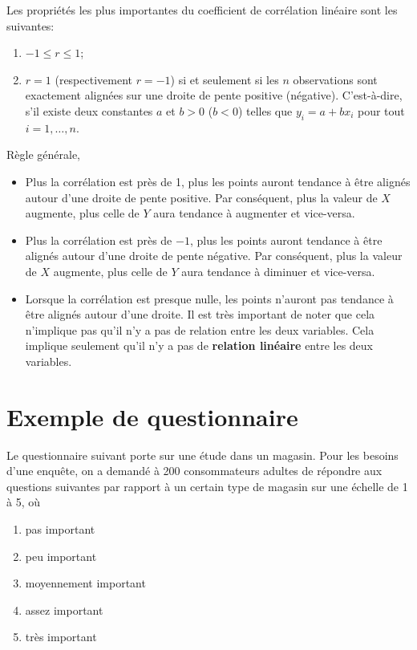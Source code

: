 \documentclass[
]{book}
\providecommand{\tightlist}{%
  \setlength{\itemsep}{0pt}\setlength{\parskip}{0pt}}
\theoremstyle{definition}
\theoremstyle{definition}
\theoremstyle{definition}
\theoremstyle{remark}
\begin{document}
Les propriétés les plus importantes du coefficient de corrélation linéaire sont les suivantes:

\begin{enumerate}
\def\labelenumi{\arabic{enumi})}
\tightlist
\item
  \(-1 \leq r \leq 1\);
\item
  \(r=1\) (respectivement \(r=-1\)) si et seulement si les \(n\) observations sont exactement alignées sur une droite de pente positive (négative). C'est-à-dire, s'il existe deux constantes \(a\) et \(b>0\) (\(b<0\)) telles que \(y_i=a+b x_i\) pour tout \(i=1, \ldots, n\).
\end{enumerate}

Règle générale,

\begin{itemize}
\tightlist
\item
  Plus la corrélation est près de 1, plus les points auront tendance à être alignés autour d'une droite de pente positive. Par conséquent, plus la valeur de \(X\) augmente, plus celle de \(Y\) aura tendance à augmenter et vice-versa.
\item
  Plus la corrélation est près de \(-1\), plus les points auront tendance à être alignés autour d'une droite de pente négative. Par conséquent, plus la valeur de \(X\) augmente, plus celle de \(Y\) aura tendance à diminuer et vice-versa.
\item
  Lorsque la corrélation est presque nulle, les points n'auront pas tendance à être alignés autour d'une droite. Il est très important de noter que cela n'implique pas qu'il n'y a pas de relation entre les deux variables. Cela implique seulement qu'il n'y a pas de \textbf{relation linéaire} entre les deux variables.
\end{itemize}

\hypertarget{exemple-de-questionnaire}{%
\section{Exemple de questionnaire}\label{exemple-de-questionnaire}}

Le questionnaire suivant porte sur une étude dans un magasin. Pour les besoins d'une enquête, on a demandé à 200 consommateurs adultes de répondre aux questions suivantes par rapport à un certain type de magasin sur une échelle de 1 à 5, où

\begin{enumerate}
\def\labelenumi{\arabic{enumi}.}
\tightlist
\item
  pas important
\item
  peu important
\item
  moyennement important
\item
  assez important
\item
  très important
\end{enumerate}
\end{document}

